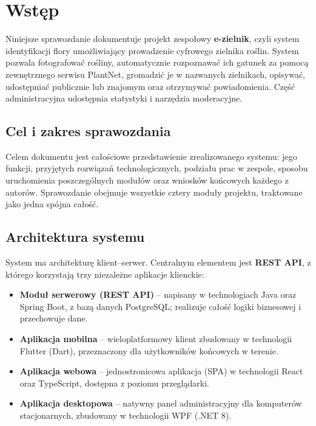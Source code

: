\documentclass[12pt,a4paper]{article}
\begin{document}
\thispagestyle{fancy}
\tableofcontents
\newpage

\section{Wst\k{e}p}

Niniejsze sprawozdanie dokumentuje projekt zespo\l{}owy \textbf{e-zielnik}, czyli system identyfikacji flory umo\.zliwiaj\k{a}cy prowadzenie cyfrowego zielnika ro\'slin. System pozwala fotografowa\'c ro\'sliny, automatycznie rozpoznawa\'c ich gatunek za pomoc\k{a} zewn\k{e}trznego serwisu PlantNet, gromadzi\'c je w nazwanych zielnikach, opisywa\'c, udost\k{e}pnia\'c publicznie lub znajomym oraz otrzymywa\'c powiadomienia. Cz\k{e}\'s\'c administracyjna udost\k{e}pnia statystyki i narz\k{e}dzia moderacyjne.

\subsection{Cel i zakres sprawozdania}

Celem dokumentu jest ca\l{}o\'sciowe przedstawienie zrealizowanego systemu: jego funkcji, przyj\k{e}tych rozwi\k{a}za\'n technologicznych, podzia\l{}u prac w zespole, sposobu uruchomienia poszczeg\'olnych modu\l{}\'ow oraz wniosk\'ow ko\'ncowych ka\.zdego z autor\'ow. Sprawozdanie obejmuje wszystkie cztery modu\l{}y projektu, traktowane jako jedna sp\'ojna ca\l{}o\'s\'c.

\subsection{Architektura systemu}

System ma architektur\k{e} klient--serwer. Centralnym elementem jest \textbf{REST API}, z kt\'orego korzystaj\k{a} trzy niezale\.zne aplikacje klienckie:

\begin{itemize}[label=\textbullet, leftmargin=1.5cm]
    \item \textbf{Modu\l{} serwerowy (REST API)} -- napisany w technologiach Java oraz Spring Boot, z baz\k{a} danych PostgreSQL; realizuje ca\l{}o\'s\'c logiki biznesowej i przechowuje dane.
    \item \textbf{Aplikacja mobilna} -- wieloplatformowy klient zbudowany w technologii Flutter (Dart), przeznaczony dla u\.zytkownik\'ow ko\'ncowych w terenie.
    \item \textbf{Aplikacja webowa} -- jednostronicowa aplikacja (SPA) w technologii React oraz TypeScript, dost\k{e}pna z poziomu przegl\k{a}darki.
    \item \textbf{Aplikacja desktopowa} -- natywny panel administracyjny dla komputer\'ow stacjonarnych, zbudowany w technologii WPF (.NET 8).
\end{itemize}
\end{document}
